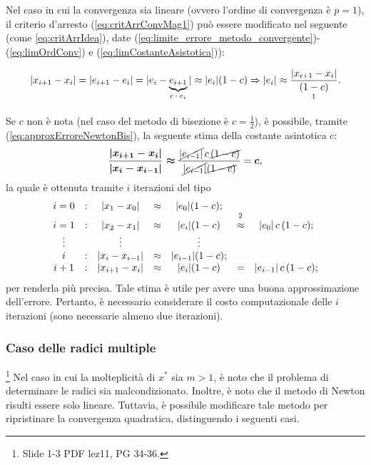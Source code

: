 Nel caso in cui la convergenza sia lineare (ovvero l'ordine di convergenza è $p=1$), il criterio d'arresto (\ref{eq:critArrConvMag1}) può essere modificato nel seguente (come \ref{eq:critArrIdea}), date (\ref{eq:limite_errore_metodo_convergente})-(\ref{eq:limOrdConv}) e (\ref{eq:limCostanteAsistotica})):

\begin{equation}\label{eq:approxErroreNewtonBis}
	|x_{i+1}-x_i|=|e_{i+1}-e_i|=|e_i-\underbrace{e_{i+1}}_\text{$c\cdot e_i$}|\approx |e_i|(1-c)\Rightarrow |e_i|\approx\frac{|x_{i+1}-x_i|}{\underset{\footnotemark}{(1-c)}}.
\end{equation}

Se $c$ non è nota (nel caso del metodo di bisezione è $c=\frac{1}{2}$), è possibile, tramite (\ref{eq:approxErroreNewtonBis}), la seguente stima della costante asintotica c:
\begin{equation*}
	\boldsymbol{\frac{|x_{i+1}-x_i|}{|x_i-x_{i-1}|}\approx}\frac{\cancel{|e_{i-1}|}\,c\,\cancel{(1-c)}}{\cancel{|e_{i-1}|}\cancel{(1-c)}}=\boldsymbol c,
\end{equation*}
la quale è ottenuta tramite $i$ iterazioni del tipo
\begin{equation*}
	\begin{matrix}
		i=0 &:& |x_1-x_0|&\approx& |e_0|(1-c);\\
		i=1 &:& |x_2-x_1|&\approx&|e_i|(1-c)&\overset{\footnotemark}{\approx}&|e_0|\, c\, (1-c);\\
		\vdots & & \vdots & & \vdots \\
		i &:&|x_i-x_{i-1}|&\approx& |e_{i-1}|(1-c);\\
		i+1 &:&|x_{i+1}-x_i|&\approx& |e_i|(1-c) &=& |e_{i-1}|\, c\, (1-c);
	\end{matrix}
\end{equation*}
per renderla più precisa. Tale stima è utile per avere una buona  approssimazione dell'errore. Pertanto, è necessario considerare il costo computazionale delle $i$ iterazioni (sono necessarie almeno due iterazioni).

\subsubsection{Caso delle radici multiple}
\footnote{Slide 1-3 PDF lez11, PG 34-36.}
Nel caso in cui la molteplicità di $x^*$ sia $m>1$, è noto che il problema di determinare le radici sia malcondizionato. Inoltre, è noto che il metodo di Newton risulti essere solo lineare. Tuttavia, è possibile modificare tale metodo per ripristinare la convergenza quadratica, distinguendo i seguenti casi.

